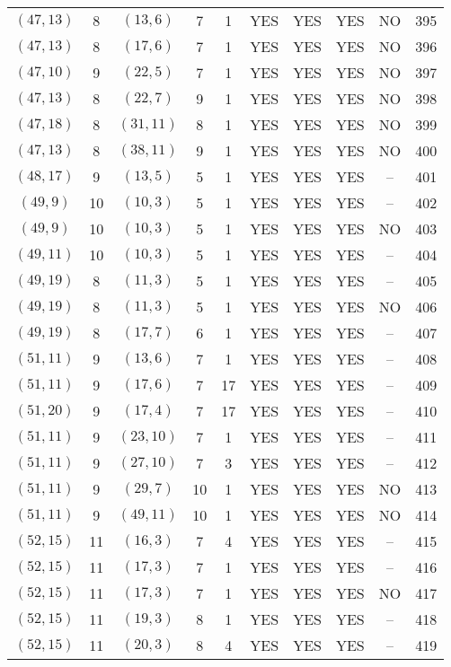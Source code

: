 \begin{longtable}{|c|c|c|c|c|c|c|c|c|c|}
$(47, 13)$ & 8 & $(13, 6)$ & 7 & 1 & YES & YES & YES & NO & 395\\
$(47, 13)$ & 8 & $(17, 6)$ & 7 & 1 & YES & YES & YES & NO & 396\\
$(47, 10)$ & 9 & $(22, 5)$ & 7 & 1 & YES & YES & YES & NO & 397\\
$(47, 13)$ & 8 & $(22, 7)$ & 9 & 1 & YES & YES & YES & NO & 398\\
$(47, 18)$ & 8 & $(31, 11)$ & 8 & 1 & YES & YES & YES & NO & 399\\
$(47, 13)$ & 8 & $(38, 11)$ & 9 & 1 & YES & YES & YES & NO & 400\\
$(48, 17)$ & 9 & $(13, 5)$ & 5 & 1 & YES & YES & YES & -- & 401\\
$(49, 9)$ & 10 & $(10, 3)$ & 5 & 1 & YES & YES & YES & -- & 402\\
$(49, 9)$ & 10 & $(10, 3)$ & 5 & 1 & YES & YES & YES & NO & 403\\
$(49, 11)$ & 10 & $(10, 3)$ & 5 & 1 & YES & YES & YES & -- & 404\\
$(49, 19)$ & 8 & $(11, 3)$ & 5 & 1 & YES & YES & YES & -- & 405\\
$(49, 19)$ & 8 & $(11, 3)$ & 5 & 1 & YES & YES & YES & NO & 406\\
$(49, 19)$ & 8 & $(17, 7)$ & 6 & 1 & YES & YES & YES & -- & 407\\
$(51, 11)$ & 9 & $(13, 6)$ & 7 & 1 & YES & YES & YES & -- & 408\\
$(51, 11)$ & 9 & $(17, 6)$ & 7 & 17 & YES & YES & YES & -- & 409\\
$(51, 20)$ & 9 & $(17, 4)$ & 7 & 17 & YES & YES & YES & -- & 410\\
$(51, 11)$ & 9 & $(23, 10)$ & 7 & 1 & YES & YES & YES & -- & 411\\
$(51, 11)$ & 9 & $(27, 10)$ & 7 & 3 & YES & YES & YES & -- & 412\\
$(51, 11)$ & 9 & $(29, 7)$ & 10 & 1 & YES & YES & YES & NO & 413\\
$(51, 11)$ & 9 & $(49, 11)$ & 10 & 1 & YES & YES & YES & NO & 414\\
$(52, 15)$ & 11 & $(16, 3)$ & 7 & 4 & YES & YES & YES & -- & 415\\
$(52, 15)$ & 11 & $(17, 3)$ & 7 & 1 & YES & YES & YES & -- & 416\\
$(52, 15)$ & 11 & $(17, 3)$ & 7 & 1 & YES & YES & YES & NO & 417\\
$(52, 15)$ & 11 & $(19, 3)$ & 8 & 1 & YES & YES & YES & -- & 418\\
$(52, 15)$ & 11 & $(20, 3)$ & 8 & 4 & YES & YES & YES & -- & 419\\

\end{longtable}
